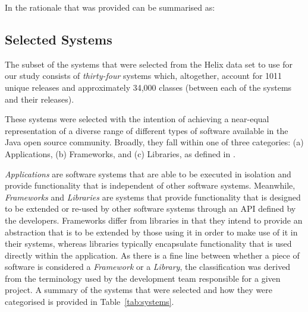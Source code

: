 In \cite{Vasa10a} the rationale that was provided can be summarised as:









\subsection{Selected Systems} %
\label{sub:selected_systems}


The subset of the systems that were selected from the Helix data set to use for our study consists of \emph{thirty-four} systems which, altogether, account for 1011 unique releases and approximately 34,000 classes (between each of the systems and their releases).

These systems were selected with the intention of achieving a near-equal representation of a diverse range of different types of software available in the Java open source community. Broadly, they fall within one of three categories: (a) Applications, (b) Frameworks, and (c) Libraries, as defined in \cite{Vasa10a}.

\emph{Applications} are software systems that are able to be executed in isolation and provide functionality that is independent of other software systems. Meanwhile, \emph{Frameworks} and \emph{Libraries} are systems that provide functionality that is designed to be extended or re-used by other software systems through an API defined by the developers. Frameworks differ from libraries in that they intend to provide an abstraction that is to be extended by those using it in order to make use of it in their systems, whereas libraries typically encapsulate functionality that is used directly within the application. As there is a fine line between whether a piece of software is considered a \emph{Framework} or a \emph{Library}, the classification was derived from the terminology used by the development team responsible for a given project. A summary of the systems that were selected and how they were categorised is provided in Table~\ref{tab:systems}.


